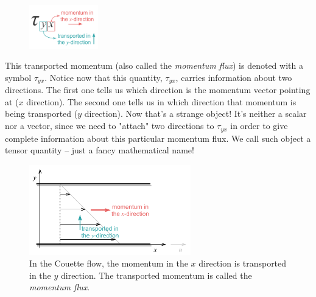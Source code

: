 \documentclass[10pt,twocolumn]{article}
\begin{document}
\begin{figure}
\centering\includegraphics[width=3cm]{tau_y_x.pdf}
\label{fig:tau_y_x}
\end{figure}
This transported momentum (also called the \textit{momentum flux}) is denoted with a symbol $\tau_{yx}$. Notice now that this quantity, $\tau_{yx}$, carries information about two directions. The first one tells us which direction is the momentum vector pointing at ($x$ direction). The second one tells us in which direction that momentum is being transported ($y$ direction). Now that's a strange object! It's neither a scalar nor a vector, since we need to "attach" two directions to $\tau_{yx}$ in order to give complete information about this particular momentum flux. We call such object a tensor quantity -- just a fancy mathematical name!
\begin{figure}[t!]
\centering\includegraphics[width=7cm]{couette-flow-momentum-transport.pdf}
\caption{In the Couette flow, the momentum in the $x$ direction is transported in the $y$ direction. The transported momentum is called the \textit{momentum flux}.}
\label{fig:couette-flow-momentum-transport}
\end{figure}
\end{document}
